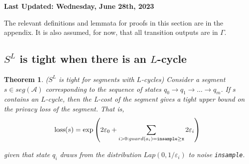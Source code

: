 \documentclass{article}
\newtheorem{theorem}{Theorem}
\renewcommand{\epsilon}{\varepsilon}
\newcommand{\loss}{\textup{loss}}
\newcommand{\insamplegeqx}{\textup{\texttt{insample$\geq$x}}}
\newcommand{\insample}{\textup{\texttt{insample}}}
\begin{document}
\textbf{Last Updated: Wednesday, June 28th, 2023}

The relevant definitions and lemmata for proofs in this section are in the appendix. It is also assumed, for now, that all transition outputs are in $\Gamma$. 

\subsection{$S^L$ is tight when there is an $L$-cycle}

\begin{theorem} ($S^L$ is tight for segments with $L$-cycles)
    Consider a segment $s \in seg(\mathcal{A})$ corresponding to the sequence of states $q_0 \to q_1 \to \dots \to q_m$. If $s$ contains an $L$-cycle, then the L-cost of the segment gives a tight upper bound on the privacy loss of the segment. That is, \[\loss(s) =  \exp\left(2 \epsilon_0 + \sum_{i > 0: guard(a_i) = \insamplegeqx} 2\epsilon_i \right)\]

    given that state $q_i$ draws from the distribution $Lap(0, 1/\epsilon_i)$ to noise \insample.
\end{theorem}
\end{document}
